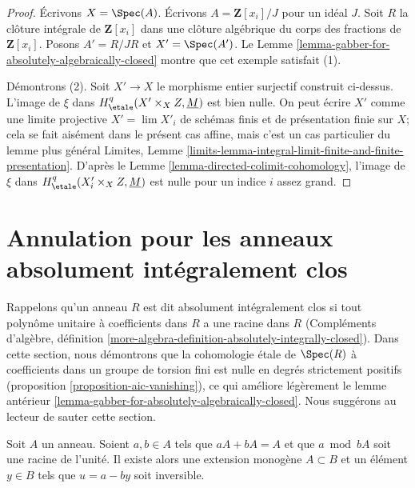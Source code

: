 \begin{proof}
Écrivons $X = \Spec(A)$. Écrivons $A = \mathbf{Z}[x_i]/J$ pour un idéal $J$.
Soit $R$ la clôture intégrale de $\mathbf{Z}[x_i]$ dans une clôture
algébrique du corps des fractions de $\mathbf{Z}[x_i]$. Posons
$A' = R/JR$ et $X' = \Spec(A')$. Le Lemme
\ref{lemma-gabber-for-absolutely-algebraically-closed} montre que cet exemple satisfait (1).

\medskip\noindent
Démontrons (2). Soit $X' \to X$ le morphisme entier surjectif construit
ci-dessus. L'image de $\xi$ dans
$H^q_\etale(X' \times_X Z, \underline{M})$ est bien nulle. On peut écrire $X'$ comme une
limite projective $X' = \lim X'_i$ de schémas finis et de présentation finie
sur $X$; cela se fait aisément dans le présent cas affine, mais c'est
un cas particulier du lemme plus général Limites, Lemme
\ref{limits-lemma-integral-limit-finite-and-finite-presentation}.
D'après le Lemme \ref{lemma-directed-colimit-cohomology},
l'image de $\xi$ dans $H^q_\etale(X'_i \times_X Z, \underline{M})$ est nulle
pour un indice $i$ assez grand.
\end{proof}








\section{Annulation pour les anneaux absolument intégralement clos}
\label{section-aic-vanishing}

\noindent
Rappelons qu'un anneau $R$ est dit absolument intégralement clos
si tout polynôme unitaire à coefficients dans $R$ a une racine dans $R$
(Compléments d'algèbre, définition
\ref{more-algebra-definition-absolutely-integrally-closed}).
Dans cette section, nous démontrons que la cohomologie étale de
$\Spec(R)$ à coefficients dans un groupe de torsion fini
est nulle en degrés strictement positifs (proposition \ref{proposition-aic-vanishing}),
ce qui améliore légèrement le
lemme antérieur \ref{lemma-gabber-for-absolutely-algebraically-closed}.
Nous suggérons au lecteur de sauter cette section.

\begin{lemma}
\label{lemma-find-extension}
Soit $A$ un anneau. Soient $a, b \in A$ tels que
$aA + bA = A$ et que $a \bmod bA$ soit une racine de l'unité.
Il existe alors une extension monogène $A \subset B$
et un élément $y \in B$ tels que $u = a - by$ soit inversible.
\end{lemma}

